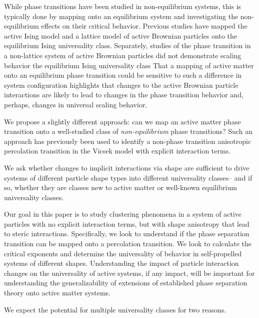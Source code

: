 While phase transitions have been studied in non-equilibrium systems, this is typically done by mapping onto an equilibrium system and investigating the non-equilibrium effects on their critical behavior.
Previous studies have mapped the active Ising model\cite{Solon_2015_PRE} and a lattice model of active Brownian particles onto the equilibrium Ising universality class\cite{Ising_yes}.
Separately, studies of the phase transition in a non-lattice system of active Brownian particles did not demonstrate scaling behavior the equilibrium Ising universality class\cite{Ising_no}
That a mapping of active matter onto an equilibrium phase transition could be sensitive to such a difference in system configuration highlights that changes to the active Brownian particle interactions are likely to lead to changes in the phase transition behavior and, perhaps, changes in universal scaling behavior.

We propose a slightly different approach: can we map an active matter phase transition onto a well-studied class of \textit{non-equilibrium} phase transitions? Such an approach has previously been used to identify a non-phase transition anisotropic percolation transition in the Vicsek model with explicit interaction terms\cite{Flock_percolation_2019,Vicsek_1995_PRL}.

We ask whether changes to implicit interactions via shape are sufficient to drive systems of different particle shape types into different universality classes-- and if so, whether they are classes new to active matter or well-known equilibrium universality classes.


Our goal in this paper is to study clustering phenomena in a system of active particles with no explicit interaction terms, but with shape anisotropy that lead to steric interactions.
Specifically, we look to understand if the phase separation transition can be mapped onto a percolation transition.
We look to calculate the critical exponents and determine the universality of behavior in self-propelled systems of different shapes.
Understanding the impact of particle interaction changes on the universality of active systems, if any impact, will be important for understanding the generalizability of extensions of established phase separation theory onto active matter systems.

We expect the potential for multiple universality classes for two reasons.

